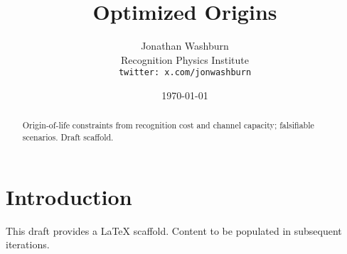 \documentclass[11pt,letterpaper]{article}
\title{Optimized Origins}
\author{Jonathan Washburn\\Recognition Physics Institute\\\texttt{twitter: x.com/jonwashburn}}
\date{\today}
\begin{document}
\maketitle
\begin{abstract}
Origin-of-life constraints from recognition cost and channel capacity; falsifiable scenarios. Draft scaffold.
\end{abstract}
\section{Introduction}
This draft provides a LaTeX scaffold. Content to be populated in subsequent iterations.
\end{document}
